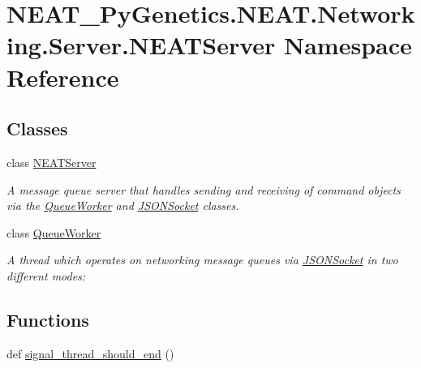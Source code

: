 \hypertarget{namespaceNEAT__PyGenetics_1_1NEAT_1_1Networking_1_1Server_1_1NEATServer}{}\section{N\+E\+A\+T\+\_\+\+Py\+Genetics.\+N\+E\+A\+T.\+Networking.\+Server.\+N\+E\+A\+T\+Server Namespace Reference}
\label{namespaceNEAT__PyGenetics_1_1NEAT_1_1Networking_1_1Server_1_1NEATServer}
\subsection*{Classes}
\begin{DoxyCompactItemize}
\item 
class \hyperlink{classNEAT__PyGenetics_1_1NEAT_1_1Networking_1_1Server_1_1NEATServer_1_1NEATServer}{N\+E\+A\+T\+Server}
\begin{DoxyCompactList}\small\item\em A message queue server that handles sending and receiving of command objects via the \hyperlink{classNEAT__PyGenetics_1_1NEAT_1_1Networking_1_1Server_1_1NEATServer_1_1QueueWorker}{Queue\+Worker} and \hyperlink{namespaceNEAT__PyGenetics_1_1NEAT_1_1Networking_1_1Server_1_1JSONSocket}{J\+S\+O\+N\+Socket} classes. \end{DoxyCompactList}\item 
class \hyperlink{classNEAT__PyGenetics_1_1NEAT_1_1Networking_1_1Server_1_1NEATServer_1_1QueueWorker}{Queue\+Worker}
\begin{DoxyCompactList}\small\item\em A thread which operates on networking message queues via \hyperlink{namespaceNEAT__PyGenetics_1_1NEAT_1_1Networking_1_1Server_1_1JSONSocket}{J\+S\+O\+N\+Socket} in two different modes\+: \end{DoxyCompactList}\end{DoxyCompactItemize}
\subsection*{Functions}
\begin{DoxyCompactItemize}
\item 
def \hyperlink{namespaceNEAT__PyGenetics_1_1NEAT_1_1Networking_1_1Server_1_1NEATServer_a7f23754a67df20fada4b79bc4061da68}{signal\+\_\+thread\+\_\+should\+\_\+end} ()
\end{DoxyCompactItemize}

